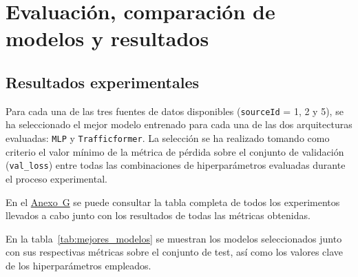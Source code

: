 \section{Evaluación, comparación de modelos y resultados}
\label{sec:evaluacion}

\subsection{Resultados experimentales}
\label{sec:resultados_exp}

Para cada una de las tres fuentes de datos disponibles (\texttt{sourceId} = 1, 2 y 5), se ha seleccionado el mejor modelo entrenado para cada una de las dos arquitecturas evaluadas: \texttt{MLP} y \texttt{Trafficformer}. La selección se ha realizado tomando como criterio el valor mínimo de la métrica de pérdida sobre el conjunto de validación (\texttt{val\_loss}) entre todas las combinaciones de hiperparámetros evaluadas durante el proceso experimental.

En el \hyperref[anexo:resultados_exp]{Anexo~G} se puede consultar la tabla completa de todos los experimentos llevados a cabo junto con los resultados de todas las métricas obtenidas.

En la tabla~\ref{tab:mejores_modelos} se muestran los modelos seleccionados junto con sus respectivas métricas sobre el conjunto de test, así como los valores clave de los hiperparámetros empleados.

